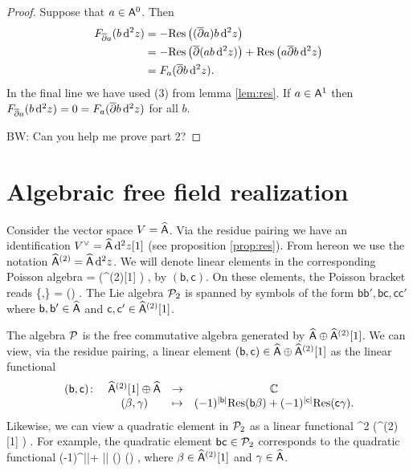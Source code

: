 \documentclass[11pt]{amsart}
\def\C{{\mathbb{C}}}
\newcommand{\laurent}{\Hat \sfA}
\newcommand{\sfb}{\mathsf{b}}
\newcommand{\sfc}{\mathsf{c}}
\def\brian#1{{\textcolor{blue!65!red}{BW: {#1}}}}
\begin{document}
\begin{proof}
Suppose that $a \in \mathsf A^0$. 
Then
\begin{align*}
F_{{\overline{\partial}} a} (b\, {\rm d}^2 z) & = - {\rm Res} \left( ({\overline{\partial}} a) b \,{\rm d}^2 z \right) \\
& = - {\rm Res}\left( {\overline{\partial}}(a b \,{\rm d}^2 z) \right) + {\rm Res} \left(a {\overline{\partial}} b \,{\rm d}^2 z\right) \\
& = F_{a} ({\overline{\partial}} b \,{\rm d}^2 z) .
\end{align*}
In the final line we have used (3) from lemma \ref{lem:res}.
If $a \in \mathsf A^1$ then $F_{{\overline{\partial}} a}(b \,{\rm d}^2 z) = 0 = F_{a} ({\overline{\partial}} b \,{\rm d}^2 z)$ for all $b$.

\brian{Can you help me prove part 2?}
\end{proof}

\section{Algebraic free field realization}

Consider the vector space $V = \laurent$.
Via the residue pairing we have an identification $V^\vee = \laurent \, \d^2 z [1]$ (see proposition \ref{prop:res}).
From hereon we use the notation $\laurent^{(2)} = \laurent \, \d^2 z$.
We will denote linear elements in the corresponding Poisson algebra
\beqn
\cP = \Sym \left(\laurent  \oplus \laurent^{(2)}[1] \right) ,
\eeqn
by $(\sfb , \sfc)$.
On these elements, the Poisson bracket reads
\beqn
\{\sfb ,\sfc\} = \Res(\sfb \sfc) .
\eeqn
The Lie algebra $\mathcal P_2$ is spanned by symbols of the form $\sfb \sfb',\sfb \sfc, \sfc \sfc'$ where $\sfb,\sfb'\in \laurent$ and $\sfc,\sfc' \in \laurent^{(2)}[1]$.

The algebra $\mathcal P$ is the free commutative algebra generated by $\laurent \oplus \laurent^{(2)}[1]$.
We can view, via the residue pairing, a linear element $(\sfb, \sfc) \in \laurent \oplus \laurent^{(2)}[1]$ as the linear functional
\[
\begin{array}{cccc}
(\sfb, \sfc) \colon & \laurent^{(2)} [1] \oplus \laurent & \to & \C\\
& (\beta, \gamma) & \mapsto  &(-1)^{|\sfb|} \Res(\sfb \beta) + (-1)^{|\sfc|} \Res(\sfc \gamma) .
\end{array}
\]
Likewise, we can view a quadratic element in $\mathcal P_2$ as a linear functional
\beqn
\Sym^2 \left(\laurent^{(2)} [1] \oplus \laurent \right) \to \C .
\eeqn
For example, the quadratic element $\sfb \sfc \in \cP_2$ corresponds to the quadratic functional
\beqn
\beta \gamma \mapsto (-1)^{|\sfb|+ |\sfc|} \Res (\sfb \beta) \Res(\sfc \gamma) ,
\eeqn
where $\beta \in \laurent^{(2)} [1]$ and $\gamma \in \laurent$.
\end{document}
